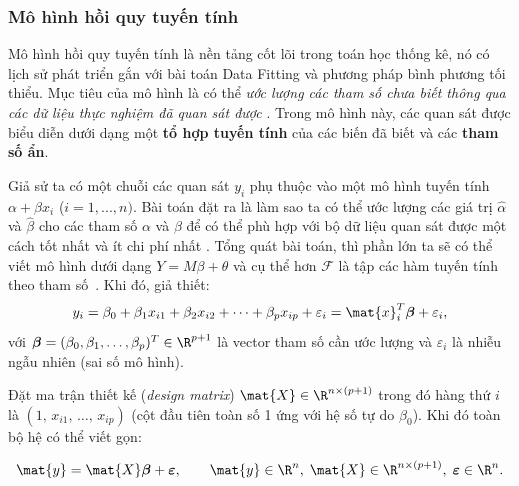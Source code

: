 \subsubsection{Mô hình hồi quy tuyến tính}
Mô hình hồi quy tuyến tính là nền tảng cốt lõi trong toán học thống kê, nó có lịch sử phát triển gắn với bài toán Data Fitting và phương pháp bình phương tối thiểu. Mục tiêu của mô hình là có thể \textit{ước lượng các tham số chưa biết thông qua các dữ liệu thực nghiệm đã quan sát được} \cite{plackett1972}. Trong mô hình này, các quan sát được biểu diễn dưới dạng một \textbf{tổ hợp tuyến tính} của các biến đã biết và các \textbf{tham số ẩn}.  

Giả sử ta có một chuỗi các quan sát $y_i$ phụ thuộc vào một mô hình tuyến tính $\alpha + \beta x_i$ ($i = 1, ...,n)$. Bài toán đặt ra là làm sao ta có thể ước lượng các giá trị $\hat{\alpha}$ và $\hat{\beta}$ cho các tham số $\alpha$ và $\beta$ để có thể phù hợp với bộ dữ liệu quan sát được một cách tốt nhất và ít chi phí nhất \cite{plackett1972}. Tổng quát bài toán, thì phần lớn ta sẽ có thể viết mô hình dưới dạng $Y = M\beta + \theta$ và cụ thể hơn $\mathcal{F}$ là tập
các hàm tuyến tính theo tham số~\cite{strang2023}. Khi đó, giả thiết:
\[
    y_i = \beta_0 + \beta_1 x_{i1} + \beta_2 x_{i2} + \cdots + \beta_p x_{ip}
        + \varepsilon_i
        = \mat{x}_i^T \boldsymbol{\beta} + \varepsilon_i,
\]
với $\boldsymbol{\beta} = (\beta_0, \beta_1, \ldots, \beta_p)^T \in \R^{p+1}$
là vector tham số cần ước lượng và $\varepsilon_i$ là nhiễu ngẫu nhiên (sai số
mô hình).

Đặt ma trận thiết kế (\textit{design matrix})
$\mat{X} \in \R^{n \times (p+1)}$ trong đó hàng thứ $i$ là
$(1,\, x_{i1},\, \ldots,\, x_{ip})$ (cột đầu tiên toàn số 1 ứng với hệ số tự
do $\beta_0$). Khi đó toàn bộ hệ có thể viết gọn:

\begin{equation}
    \mat{y} = \mat{X}\boldsymbol{\beta} + \boldsymbol{\varepsilon},
    \qquad \mat{y} \in \R^n,\;
           \mat{X} \in \R^{n \times (p+1)},\;
           \boldsymbol{\varepsilon} \in \R^n.
    \label{eq:linear_model}
\end{equation}

